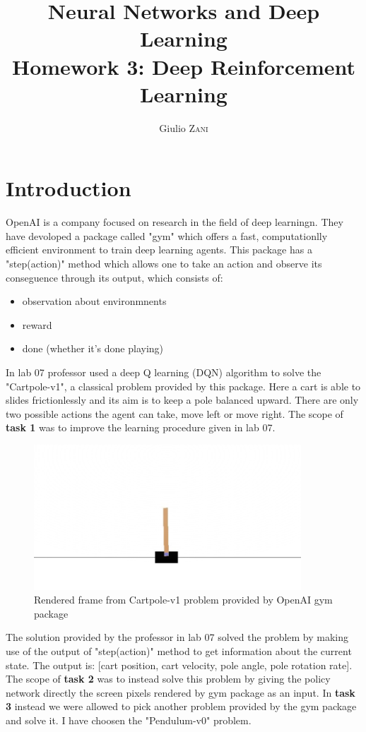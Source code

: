 \documentclass{article}
\title{Neural Networks and Deep Learning \\ Homework 3: Deep Reinforcement Learning}
\author{Giulio \textsc{Zani}} %
\begin{document}
\maketitle

\tableofcontents

\section{Introduction}
OpenAI is a company focused on research in the field of deep learningn. They have devoloped a package called "gym" which offers a fast, computationlly efficient environment to train deep learning agents.
This package has a "step(action)" method which allows one to take an action and observe its conseguence through its output, which consists of:
\begin{itemize}
  \item observation about environmnents
  \item reward 
  \item done (whether it's done playing)
\end{itemize}

In lab 07 professor used a deep Q learning (DQN) algorithm to solve the "Cartpole-v1", a classical problem provided by this package. Here a cart is able to slides frictionlessly and its aim is to keep a pole balanced upward. There are only two possible actions the agent can take, move left or move right. The scope of \textbf{task 1} was to improve the learning procedure given in lab 07.
\begin{figure}[H]
  \begin{center}
    \includegraphics[width=10cm]{imgs/cartpole-v1.png}
    \caption{Rendered frame from Cartpole-v1 problem provided by OpenAI gym package}\label{cartpole-v1}
  \end{center}
\end{figure}
The solution provided by the professor in lab 07 solved the problem by making use of the output of "step(action)" method to get information about the current state. The output is: [cart position, cart velocity, pole angle, pole rotation rate]. The scope of \textbf{task 2} was to instead solve this problem by giving the policy network directly the screen pixels rendered by gym package as an input.
In \textbf{task 3} instead we were allowed to pick another problem provided by the gym package and solve it. I have choosen the "Pendulum-v0" problem.
\end{document}
